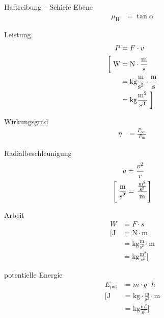 \begin{karte}{Haftreibung -- Schiefe Ebene}
    \begin{align*}
        \mu_\text{H} &= \tan \alpha
    \end{align*}
\end{karte}

\begin{karte}{Leistung}
    \begin{align*}
        P &= F \cdot v \\
        \left[ \vphantom{\frac{m^2}{s^3}} \right.
            \text{W} &= 
            \text{N} \cdot \frac{\text{m}}{\text{s}} \\
            &= \text{kg} \frac{\text{m}}{\text{s}^2} \cdot \frac{\text{m}}{\text{s}} \\
            &= \text{kg} \frac{\text{m}^2}{\text{s}^3} 
            \left. \vphantom{\frac{m^2}{s^3}} \right]
    \end{align*}
\end{karte}

\begin{karte}{Wirkungsgrad}
    \begin{align*}
        \eta &= \frac{P_\text{out}}{P_\text{in}}
    \end{align*}
\end{karte}

\begin{karte}{Radialbeschleunigung}
    \begin{align*}
        a &= \frac{v^2}{r} \\
        \left[ \vphantom{\frac{\frac{\text{m}^2}{\text{s}^2}}{\text{m}}} \right.
            \frac{\text{m}}{\text{s}^2} &= \left.  \frac{\frac{\text{m}^2}{\text{s}^2}}{\text{m}} 
             \right]
    \end{align*}
\end{karte}

\begin{karte}{Arbeit}
    \begin{align*}
        W &= F \cdot s \\
        \bigg[
            \text{J} &= \text{N} \cdot \text{m} \\
            &= \text{kg}\frac{\text{m}}{\text{s}^2} \cdot \text{m}\\
            &= \text{kg}\frac{\text{m}^2}{\text{s}^2}  
            \bigg]
    \end{align*}
\end{karte}

\begin{karte}{potentielle Energie}
    \begin{align*}
        E_\text{pot} &= m \cdot g \cdot h \\
        \bigg[
            \text{J} &= \text{kg} \cdot \frac{\text{m}}{\text{s}^2} \cdot \text{m} \\
            &= \text{kg}\frac{\text{m}^2}{\text{s}^2} 
            \bigg]
    \end{align*}
\end{karte}


